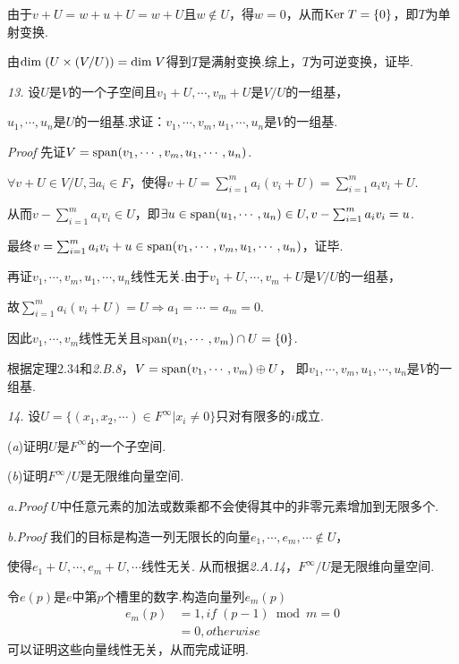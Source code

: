 由于\(v+U=w+u+U=w+U\)且\(w \notin U\)，得\(w=0\)，从而\(\mathrm{Ker \;} T=\{0\}\)，即\(T\)为单射变换.

由\(\mathrm{dim \;} (U \times (V/U))=\mathrm{dim \;} V\)得到\(T\)是满射变换.综上，\(T\)为可逆变换，证毕.

\newpage

\textit{13.}
设\(U\)是\(V\)的一个子空间且\(v_1+U,\cdots,v_m+U\)是\(V/U\)的一组基，

\(u_1,\cdots,u_n\)是\(U\)的一组基.求证：\(v_1,\cdots,v_m,u_1,\cdots,u_n\)是\(V\)的一组基.

\textit{Proof}
先证\(V=\mathrm{span} (v_1,\cdots,v_m,u_1,\cdots,u_n)\).

\(\forall v+U \in V/U, \exists a_i \in F\)，使得\(v+U=\sum_{i=1}^m a_i(v_i+U)=\sum_{i=1}^m a_iv_i+U\).

从而\(v-\sum_{i=1}^m a_iv_i \in U\)，即\(\exists u \in \mathrm{span} (u_1,\cdots,u_n) \in U,v-\sum_{i=1}^m a_iv_i=u\).

最终\(v=\sum_{i=1}^m a_iv_i+u \in \mathrm{span} (v_1,\cdots,v_m,u_1,\cdots,u_n)\)，证毕.

再证\(v_1,\cdots,v_m,u_1,\cdots,u_n\)线性无关.由于\(v_1+U,\cdots,v_m+U\)是\(V/U\)的一组基，

故\(\sum_{i=1}^m a_i(v_i+U)=U \Rightarrow a_1=\cdots=a_m=0\).

因此\(v_1,\cdots,v_m\)线性无关且\(\mathrm{span} (v_1,\cdots,v_m) \cap U=\{0\}\).

根据定理2.34和\textit{2.B.8}，\(V=\mathrm{span} (v_1,\cdots,v_m) \oplus U\)，
即\(v_1,\cdots,v_m,u_1,\cdots,u_n\)是\(V\)的一组基.

\hspace*{\fill}

\textit{14.}
设\(U=\{(x_1,x_2,\cdots)\in F^\infty | x_i \ne 0\}\)只对有限多的\(i\)成立.

(\textit{a})证明\(U\)是\(F^\infty\)的一个子空间.

(\textit{b})证明\(F^\infty /U\)是无限维向量空间.

\textit{a.Proof}
\(U\)中任意元素的加法或数乘都不会使得其中的非零元素增加到无限多个.

\textit{b.Proof}
我们的目标是构造一列无限长的向量\(e_1,\cdots,e_m,\cdots \notin U\)，

使得\(e_1+U,\cdots,e_m+U,\cdots\)线性无关.
从而根据\textit{2.A.14}，\(F^\infty /U\)是无限维向量空间.

令\(e(p)\)是\(e\)中第\(p\)个槽里的数字.构造向量列\(e_m(p)\)
    \begin{align*}
        e_m(p) &=1,\textit{if} \; (p-1) \bmod m=0 \\
            &=0,\textit{otherwise}
    \end{align*}
可以证明这些向量线性无关，从而完成证明.

